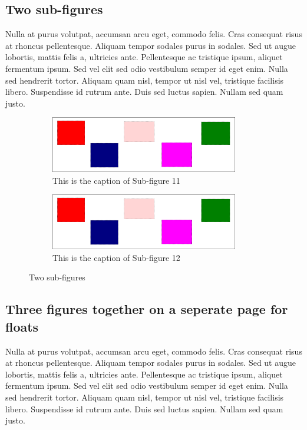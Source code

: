 \subsection{Two sub-figures}
Nulla at purus volutpat, accumsan arcu eget, commodo felis. Cras consequat
risus at rhoncus pellentesque. Aliquam tempor sodales purus in sodales. Sed ut
augue lobortis, mattis felis a, ultricies ante. Pellentesque ac tristique
ipsum, aliquet fermentum ipsum. Sed vel elit sed odio vestibulum semper id eget
enim. Nulla sed hendrerit tortor. Aliquam quam nisl, tempor ut nisl vel,
tristique facilisis libero. Suspendisse id rutrum ante. Duis sed luctus sapien.
Nullam sed quam justo.
\begin{figure}[h]
    \begin{subfigure}[b]{0.5\linewidth}
        \centering
            \includegraphics[width=0.9\textwidth]{figures/test_image}
            \caption{This is the caption of Sub-figure 11}
            \label{fig:subfig11}
            \end{subfigure}%
        \begin{subfigure}[b]{.5\linewidth}
            \centering
            \includegraphics[width=0.9\textwidth]{figures/test_image}
            \caption{This is the caption of Sub-figure 12}
            \label{fig:subfig12}
        \end{subfigure}
    \caption{Two sub-figures}
\label{fig:sub-figures2}
\end{figure}

\subsection{Three figures together on a seperate page for floats}
Nulla at purus volutpat, accumsan arcu eget, commodo felis. Cras consequat
risus at rhoncus pellentesque. Aliquam tempor sodales purus in sodales. Sed ut
augue lobortis, mattis felis a, ultricies ante. Pellentesque ac tristique
ipsum, aliquet fermentum ipsum. Sed vel elit sed odio vestibulum semper id eget
enim. Nulla sed hendrerit tortor. Aliquam quam nisl, tempor ut nisl vel,
tristique facilisis libero. Suspendisse id rutrum ante. Duis sed luctus sapien.
Nullam sed quam justo.

